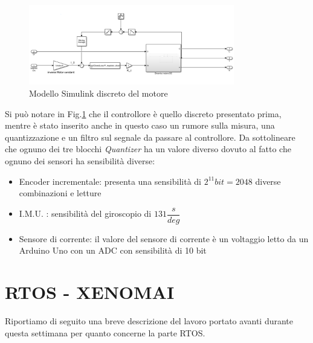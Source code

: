 \begin{figure}[H]
	\centering   	
	\includegraphics[width=0.8\textwidth]{Immagini/discrete_motor.png}
	\caption{Modello Simulink discreto del motore}
	\label{fig:discrete_motor}
\end{figure}
Si può notare in Fig.\ref{fig:discrete_motor} che il controllore è quello discreto presentato prima, mentre è stato inserito anche in questo caso un rumore sulla misura, una quantizzazione e un filtro sul segnale da passare al controllore.
Da sottolineare che ognuno dei tre blocchi \textit{Quantizer} ha un valore diverso dovuto al fatto che ognuno dei sensori ha sensibilità diverse:
\begin{itemize}
	\item Encoder incrementale: presenta una sensibilità di $2^11 bit = 2048 $ diverse combinazioni e letture
	\item I.M.U. : sensibilità del giroscopio di $131\dfrac{s}{deg}$
	\item Sensore di corrente: il valore del sensore di corrente è un voltaggio letto da un Arduino Uno con un ADC con sensibilità di 10 bit
\end{itemize}

\section{RTOS - XENOMAI}
Riportiamo di seguito una breve descrizione del lavoro portato avanti durante questa settimana per quanto concerne la parte RTOS.

